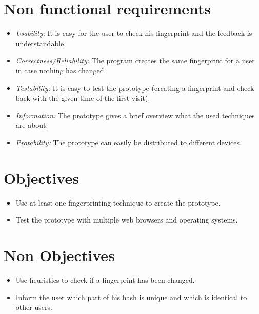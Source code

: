 \section{Non functional requirements}

\begin{itemize}
\item \textit{Usability: }It is easy for the user to check his fingerprint and the feedback is understandable.
\item \textit{Correctness/Reliability: }The program creates the same fingerprint for a user in case nothing has changed.
\item \textit{Testability: }It is easy to test the prototype (creating a fingerprint and check back with the given time of the first visit).
\item \textit{Information: }The prototype gives a brief overview what the used techniques are about. 
\item \textit{Protability: }The prototype can easily be distributed to different devices.
\end{itemize}

\section{Objectives}
\begin{itemize}
	\item Use at least one fingerprinting technique to create the prototype.
	\item Test the prototype with multiple web browsers and operating systems.
\end{itemize}

\section{Non Objectives}
\begin{itemize}
	\item Use heuristics to check if a fingerprint has been changed.
	\item Inform the user which part of his hash is unique and which is identical to other users.
\end{itemize}
